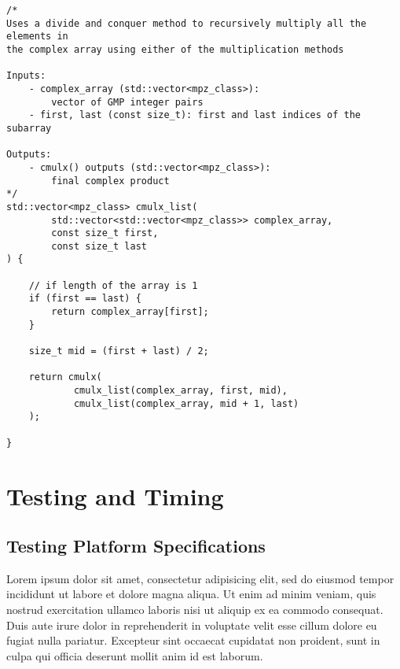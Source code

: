 \documentclass[usletter, 12pt]{article}
\begin{document}
\begin{lstlisting}
/*
Uses a divide and conquer method to recursively multiply all the elements in
the complex array using either of the multiplication methods

Inputs:
    - complex_array (std::vector<mpz_class>):
        vector of GMP integer pairs
    - first, last (const size_t): first and last indices of the subarray

Outputs:
    - cmulx() outputs (std::vector<mpz_class>):
        final complex product
*/
std::vector<mpz_class> cmulx_list(
        std::vector<std::vector<mpz_class>> complex_array,
        const size_t first,
        const size_t last
) {

    // if length of the array is 1
    if (first == last) {
        return complex_array[first];
    }

    size_t mid = (first + last) / 2;

    return cmulx(
            cmulx_list(complex_array, first, mid),
            cmulx_list(complex_array, mid + 1, last)
    );

}
\end{lstlisting}

        \iffalse
        \begin{figure}[ht]
            \begin{center}
                \texttt{[image: figures/state\_diagram.png]}
                \caption{State Diagram Implementation of the Game with the Secret Code Mapped to 0b00011011} \label{fig:state_diagram}
            \end{center}
        \end{figure}
        \fi

    \section{Testing and Timing}
        \subsection{Testing Platform Specifications}

        Lorem ipsum dolor sit amet, consectetur adipisicing elit, sed do eiusmod
        tempor incididunt ut labore et dolore magna aliqua. Ut enim ad minim veniam,
        quis nostrud exercitation ullamco laboris nisi ut aliquip ex ea commodo
        consequat. Duis aute irure dolor in reprehenderit in voluptate velit esse
        cillum dolore eu fugiat nulla pariatur. Excepteur sint occaecat cupidatat non
        proident, sunt in culpa qui officia deserunt mollit anim id est laborum.
\end{document}
